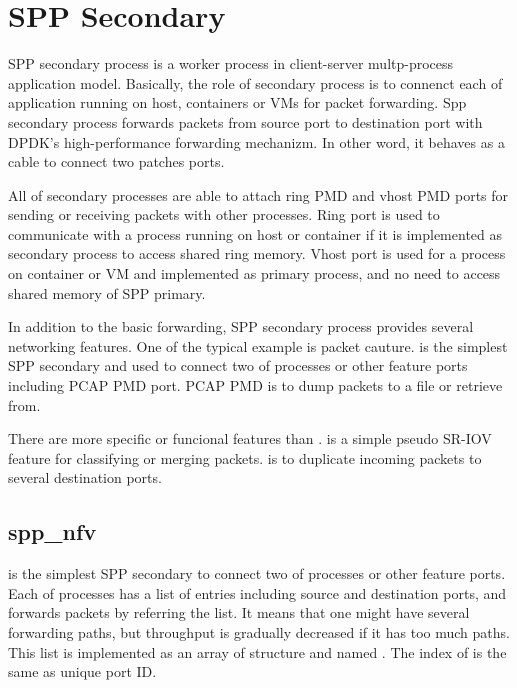 \documentclass[a4paper,11pt,openany,oneside,english]{sphinxmanual}
\begin{document}
\section{SPP Secondary}
\label{\detokenize{design/spp_secondary:spp-secondary}}\label{\detokenize{design/spp_secondary:spp-design-spp-sec}}\label{\detokenize{design/spp_secondary::doc}}
SPP secondary process is a worker process in client-server multp-process
application model. Basically, the role of secondary process is to connenct
each of application running on host, containers or VMs for packet forwarding.
Spp secondary process forwards packets from source port to destination port
with DPDK’s high-performance forwarding mechanizm. In other word, it behaves
as a cable to connect two patches ports.

All of secondary processes are able to attach ring PMD and vhost PMD ports
for sending or receiving packets with other processes. Ring port is used to
communicate with a process running on host or container if it is implemented
as secondary process to access shared ring memory.
Vhost port is used for a process on container or VM and implemented as primary
process, and no need to access shared memory of SPP primary.

In addition to the basic forwarding, SPP secondary process provides several
networking features. One of the typical example is packet cauture.
 is the simplest SPP secondary and used to connect two of processes
or other feature ports including PCAP PMD port. PCAP PMD is to dump packets to
a file or retrieve from.

There are more specific or funcional features than .  is
a simple pseudo SR-IOV feature for classifying or merging packets.
 is to duplicate incoming packets to several destination ports.


\subsection{spp\_nfv}
\label{\detokenize{design/spp_secondary:spp-nfv}}\label{\detokenize{design/spp_secondary:spp-design-spp-sec-nfv}}
 is the simplest SPP secondary to connect two of processes or other
feature ports. Each of  processes has a list of entries including
source and destination ports, and forwards packets by referring the list.
It means that one  might have several forwarding paths, but
throughput is gradually decreased if it has too much paths.
This list is implemented as an array of  structure and named
. The index of  is the same as unique
port ID.
\end{document}

